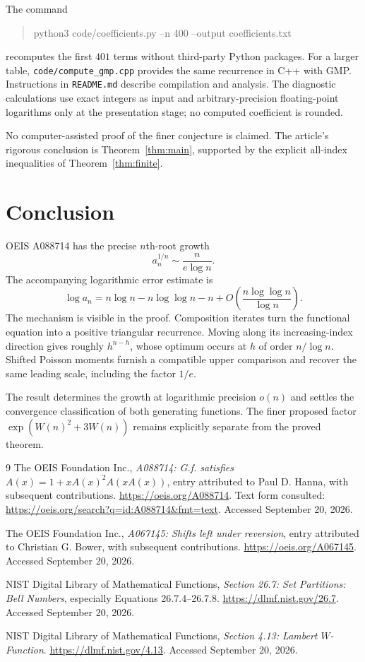 \documentclass[11pt]{article}
\numberwithin{equation}{section}
\theoremstyle{remark}
\begin{document}
The command
\begin{quote}\ttfamily
 python3 code/coefficients.py --n 400 --output coefficients.txt
\end{quote}
recomputes the first $401$ terms without third-party Python packages.
For a larger table, \texttt{code/compute\_gmp.cpp} provides the same
recurrence in C++ with GMP. Instructions in \texttt{README.md} describe
compilation and analysis. The diagnostic calculations use exact
integers as input and arbitrary-precision floating-point logarithms only
at the presentation stage; no computed coefficient is rounded.

No computer-assisted proof of the finer conjecture is claimed. The
article's rigorous conclusion is Theorem~\ref{thm:main}, supported by
the explicit all-index inequalities of Theorem~\ref{thm:finite}.

\section{Conclusion}

OEIS A088714 has the precise $n$th-root growth
\[
 \boxed{a_n^{1/n}\sim\frac{n}{e\log n}.}
\]
The accompanying logarithmic error estimate is
\[
 \log a_n=n\log n-n\log\log n-n
       +O\!\left(\frac{n\log\log n}{\log n}\right).
\]
The mechanism is visible in the proof. Composition iterates turn the
functional equation into a positive triangular recurrence. Moving along
its increasing-index direction gives roughly $h^{n-h}$, whose optimum
occurs at $h$ of order $n/\log n$. Shifted Poisson moments furnish a
compatible upper comparison and recover the same leading scale,
including the factor $1/e$.

The result determines the growth at logarithmic precision $o(n)$ and
settles the convergence classification of both generating functions.
The finer proposed factor $\exp(W(n)^2+3W(n))$ remains explicitly
separate from the proved theorem.

\begin{thebibliography}{9}
The OEIS Foundation Inc., \emph{A088714: G.f. satisfies
$A(x)=1+xA(x)^2A(xA(x))$}, entry attributed to Paul D. Hanna,
with subsequent contributions.
\url{https://oeis.org/A088714}.
Text form consulted: \url{https://oeis.org/search?q=id:A088714&fmt=text}.
Accessed September 20, 2026.

The OEIS Foundation Inc., \emph{A067145: Shifts left under reversion},
entry attributed to Christian G. Bower, with subsequent contributions.
\url{https://oeis.org/A067145}.
Accessed September 20, 2026.

NIST Digital Library of Mathematical Functions,
\emph{Section 26.7: Set Partitions: Bell Numbers}, especially
Equations 26.7.4--26.7.8.
\url{https://dlmf.nist.gov/26.7}.
Accessed September 20, 2026.

NIST Digital Library of Mathematical Functions,
\emph{Section 4.13: Lambert $W$-Function}.
\url{https://dlmf.nist.gov/4.13}.
Accessed September 20, 2026.
\end{thebibliography}
\end{document}

